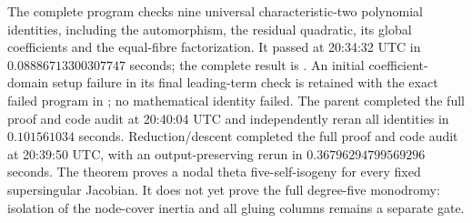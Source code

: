 \begin{remark}
\label{rem:uniform-five-theta-geometry-scope-candidate}
The complete program
checks nine universal characteristic-two polynomial identities,
including the automorphism, the residual quadratic, its global
coefficients and the equal-fibre factorization. It passed at
20:34:32 UTC in $0.08886713300307747$ seconds; the complete result is
.
An initial coefficient-domain setup failure in its final leading-term
check is retained with the exact failed program in ;
no mathematical identity failed. The parent completed the full proof and code audit at 20:40:04 UTC and independently reran all identities in $0.101561034$ seconds. Reduction/descent completed the full proof and code audit at 20:39:50 UTC, with an output-preserving rerun in $0.36796294799569296$ seconds. The theorem proves a nodal theta
five-self-isogeny for every fixed supersingular Jacobian. It does
not yet prove the full degree-five monodromy: isolation of the
node-cover inertia and all gluing columns remains a separate gate.
\end{remark}
